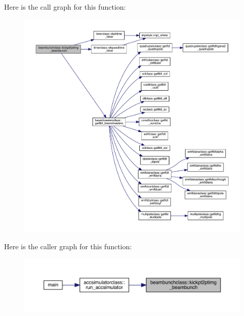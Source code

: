 Here is the call graph for this function\+:\nopagebreak
\begin{figure}[H]
\begin{center}
\leavevmode
\includegraphics[width=350pt]{namespacebeambunchclass_a01fdab4efb6d28b0604dfadfdbf302c1_cgraph}
\end{center}
\end{figure}
Here is the caller graph for this function\+:\nopagebreak
\begin{figure}[H]
\begin{center}
\leavevmode
\includegraphics[width=350pt]{namespacebeambunchclass_a01fdab4efb6d28b0604dfadfdbf302c1_icgraph}
\end{center}
\end{figure}
\mbox{\label{namespacebeambunchclass_a7cccd378d69c7b51808b6d96d3151e50}} 
